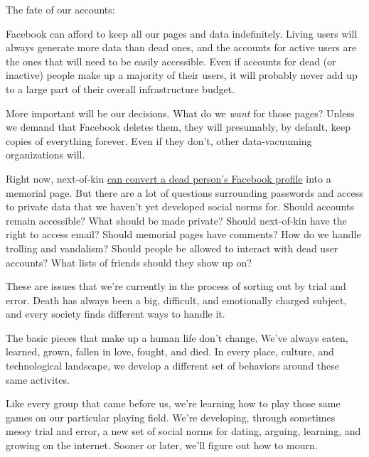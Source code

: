 {{The fate of our accounts:}

{Facebook can afford to keep all our pages and data indefinitely. Living users will always generate more data than dead ones, and the accounts for active users are the ones that will need to be easily accessible. Even if accounts for dead (or inactive) people make up a majority of their users, it will probably never add up to a large part of their overall infrastructure budget.}

{More important will be our decisions. What do we \emph{want} for those pages? Unless we demand that Facebook deletes them, they will presumably, by default, keep copies of everything forever. Even if they don't, other data-vacuuming organizations will.}

{Right now, next-of-kin \href{https://www.facebook.com/help/contact/305593649477238}{can convert a dead person's Facebook profile} into a memorial page. But there are a lot of questions surrounding passwords and access to private data that we haven't yet developed social norms for. Should accounts remain accessible? What should be made private? Should next-of-kin have the right to access email? Should memorial pages have comments? How do we handle trolling and vandalism? Should people be allowed to interact with dead user accounts? What lists of friends should they show up on?}

{These are issues that we're currently in the process of sorting out by trial and error. Death has always been a big, difficult, and emotionally charged subject, and every society finds different ways to handle it.}

{The basic pieces that make up a human life don't change. We've always eaten, learned, grown, fallen in love, fought, and died. In every place, culture, and technological landscape, we develop a different set of behaviors around these same activites.}

{Like every group that came before us, we're learning how to play those same games on our particular playing field. We're developing, through sometimes messy trial and error, a new set of social norms for dating, arguing, learning, and growing on the internet. Sooner or later, we'll figure out how to mourn.}

}
